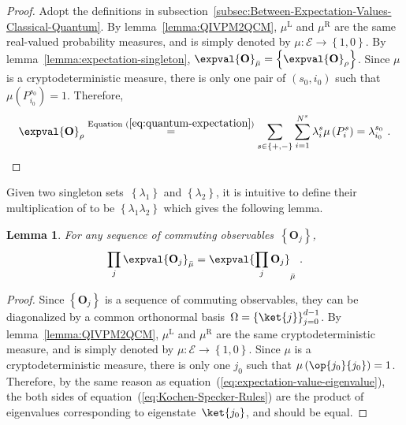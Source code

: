 \documentclass[12pt]{iopart}
\theoremstyle{plain}
\newtheorem{lemma}[thm]{Lemma}
\theoremstyle{definition}
\theoremstyle{remark}
\newcommand{\events}{\ensuremath{\mathcal{E}}}
\newcommand{\proj}[1]{\op{#1}{#1}}
\newcommand{\mul}[1][]{\ensuremath{\mu^{\mathrm{L{#1}}}}}
\newcommand{\mur}[1][]{\ensuremath{\mu^{\mathrm{R{#1}}}}}
\begin{document}
\begin{proof}Adopt the definitions in subsection~\ref{subsec:Between-Expectation-Values-Classical-Quantum}.
By lemma~\ref{lemma:QIVPM2QCM}, $\mul$ and $\mur$ are the same
real-valued probability measures, and is simply denoted by $\mu:\events\rightarrow\left\{ 1,0\right\} $.
By lemma~\ref{lemma:expectation-singleton}, $\expval{\mathbf{O}}_{\bar{\mu}}=\left\{ \expval{\mathbf{O}}_{\rho}\right\} $.
Since $\mu$ is a cryptodeterministic measure, there is only one pair
of $\left(s_{0},i_{0}\right)$ such that $\mu\left(P_{i_{0}}^{s_{0}}\right)=1$.
Therefore, 
\begin{equation}
\expval{\mathbf{O}}_{\rho}\stackrel{\textrm{Equation }(\ref{eq:quantum-expectation})}{=}\sum_{s\in\left\{ +,-\right\} }\sum_{i=1}^{N^{s}}\lambda_{i}^{s}\mu\left(P_{i}^{s}\right)=\lambda_{i_{0}}^{s_{0}}\textrm{ .}\label{eq:expectation-value-eigenvalue}
\end{equation}
\end{proof}

Given two singleton sets~$\left\{ \lambda_{1}\right\} $ and $\left\{ \lambda_{2}\right\} $,
it is intuitive to define their multiplication of to be $\left\{ \lambda_{1}\lambda_{2}\right\} $
which gives the following lemma.

\begin{lemma}For any sequence of commuting observables~$\left\{ \mathbf{O}_{j}\right\} $,
\begin{equation}
\prod_{j}\expval{\mathbf{O}_{j}}_{\bar{\mu}}=\expval{\prod_{j}\mathbf{O}_{j}}_{\bar{\mu}}\textrm{ .}\label{eq:Kochen-Specker-Rules}
\end{equation}
\end{lemma}

\begin{proof}Since $\left\{ \mathbf{O}_{j}\right\} $ is a sequence
of commuting observables, they can be diagonalized by a common orthonormal
basis~$\Omega=\left\{ \ket{j}\right\} _{j=0}^{d-1}$. By lemma~\ref{lemma:QIVPM2QCM},
$\mul$ and $\mur$ are the same cryptodeterministic measure, and
is simply denoted by $\mu:\events\rightarrow\left\{ 1,0\right\} $.
Since $\mu$ is a cryptodeterministic measure, there is only one $j_{0}$
such that $\mu\left(\proj{j_{0}}\right)=1$. Therefore, by the same
reason as equation~(\ref{eq:expectation-value-eigenvalue}), the
both sides of equation~(\ref{eq:Kochen-Specker-Rules}) are the product
of eigenvalues corresponding to eigenstate~$\ket{j_{0}}$, and should
be equal.\end{proof}
\end{document}
